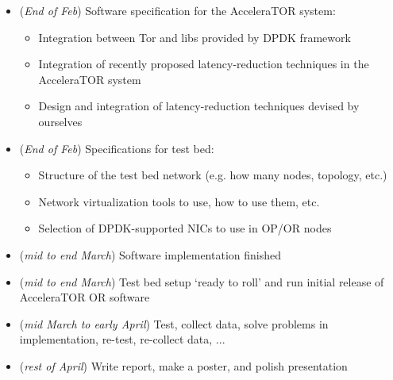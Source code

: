 \documentclass[conference]{IEEEtran}
\begin{document}
\begin{itemize}

	\item (\textit{End of Feb}) Software specification for the AcceleraTOR system: 

	\begin{itemize}

		\item Integration between Tor and libs provided by DPDK framework

		\item Integration of recently proposed latency-reduction techniques in 
		the AcceleraTOR system
		
		\item Design and integration of latency-reduction techniques devised 
		by ourselves

	\end{itemize}

	\item (\textit{End of Feb}) Specifications for test bed:

	\begin{itemize}

		\item Structure of the test bed network (e.g. how many nodes, topology, etc.)

		\item Network virtualization tools to use, how to use them, etc.

		\item Selection of DPDK-supported NICs to use in OP\slash OR nodes

	\end{itemize}

	\item (\textit{mid to end March}) Software implementation finished
	\item (\textit{mid to end March}) Test bed setup `ready to roll' and run initial release of 
		AcceleraTOR OR software
	\item (\textit{mid March to early April}) Test, collect data, solve problems in 
		implementation, re-test, re-collect data, ...
	\item (\textit{rest of April}) Write report, make a poster, and polish presentation 

\end{itemize}
%




\end{document}
